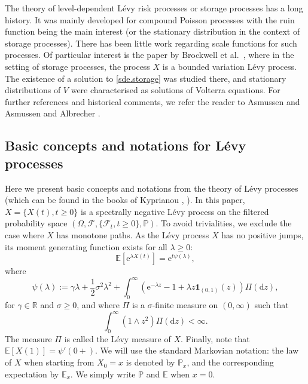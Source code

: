 \documentclass[12pt,reqno]{amsart}
\theoremstyle{definition}
\theoremstyle{remark}
\newcommand{\p}{\mathbb{P}}
\newcommand{\e}{\mathbb{E}}
\newcommand{\reals}{\mathbb{R}}
\newcommand{\ind}{\mathbf{1}}
\begin{document}
The theory of level-dependent L\'evy risk processes or storage processes has a long history. It was mainly developed for compound Poisson processes 
with the ruin function being the main interest
(or the stationary distribution in the context of storage processes). There has been little work regarding scale functions for such  processes. 
Of particular interest is the paper by Brockwell et al.\ \cite{brockwelletal82}, where in the setting of storage processes, the process $X$ is a bounded variation L\'evy process.
The existence of a solution to \eqref{sde.storage} was studied there, and stationary distributions of $V$ were characterised as solutions of Volterra equations.
 For further references and historical comments, we refer the reader to Asmussen   \cite{asmussen2003} and Asmussen and Albrecher \cite{asmussen_albrecher_2010}.

 \subsection{Basic concepts and notations for L\'evy processes}\label{ss:basic}
 Here we present basic concepts and notations from the theory of L\'evy processes (which can be found in the books of
 Kyprianou  \cite{kyprianou2006}, \cite{kyprianou2014}). 
 In this paper,  $X=\{X(t),t\geq 0\}$ is a
 spectrally negative L\'evy process on the filtered probability space $(\Omega,\mathcal{F},\{\mathcal{F}_t , t\geq0\}, \mathbb{P})$.
To avoid trivialities, we exclude the case where $X$ has monotone paths.
As the L\'{e}vy process $X$ has no positive jumps, its moment generating function exists for all $\lambda \geq 0$:
$$
\e \left[ \mathrm{e}^{\lambda X(t)} \right] = \mathrm{e}^{t \psi(\lambda)} ,
$$
where
$$
\psi(\lambda) := \gamma \lambda + \frac{1}{2} \sigma^2 \lambda^2 + \int^{\infty}_0 \left( \mathrm{e}^{-\lambda z} - 1 + \lambda z {\ind_{(0,1)}(z)}  \right) \Pi(\mathrm{d}z) ,
$$
for $\gamma \in \reals$ and $\sigma \geq 0$, and where $\Pi$ is a $\sigma$-finite measure on $(0,\infty)$ such that
$$
\int^{\infty}_0 (1 \wedge z^2) \Pi(\mathrm{d}z) < \infty .
$$
The measure $\Pi$ is called the L\'{e}vy measure of $X$. Finally, note that $\e \left[ X(1) \right] = \psi'(0+)$. We will use the standard Markovian notation: 
the law of $X$ when starting from $X_0 = x$ is denoted by $\p_x$, and the corresponding expectation by $\e_x$. We simply write $\p$ and $\e$ when $x=0$.%
\end{document}
